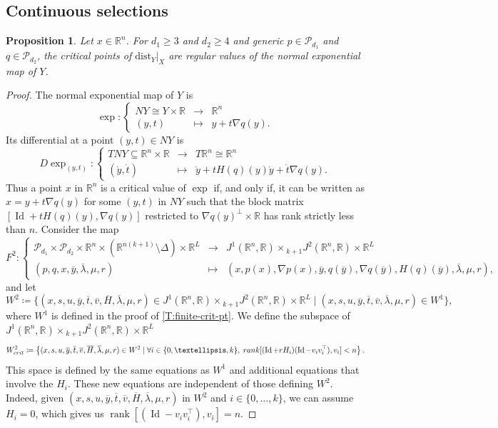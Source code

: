 \documentclass{amsart}
\newcommand{\R}{\mathbb{R}}
\newcommand{\dist}{{\mathrm{dist}_Y|_X}}
\newcommand{\Poly}{\mathscr{P}}
\def\Id{\operatorname{Id}}
\newtheorem{proposition}[subsubsection]{Proposition}
\theoremstyle{definition}
\theoremstyle{remark}
\begin{document}
\subsection{Continuous selections}

\begin{proposition}
\label{P:exp-reg-alg}
Let $x \in \R^n$. For $d_1 \geq 3$ and $d_2 \geq 4$ and generic $p\in \Poly_{d_1}$ and $q\in \Poly_{d_2}$, the critical points of $\dist$ are regular values of the normal exponential map of $Y$.
\end{proposition}

\begin{proof}
The normal exponential map of $Y$ is
\[
\exp \colon \left\{ \begin{array}{ccc}
NY \cong Y \times \R & \to & \R^n \\
(y, t) & \mapsto & y + t \nabla q(y).
\end{array} \right.
\]
Its differential at a point $(y, t) \in NY$ is
\[
D \exp_{(y, t)} \colon \left\{ \begin{array}{ccc}
TNY \subseteq \R^n \times \R & \to & T \R^n \cong \R^n \\
(\dot{y}, \dot{t}) & \mapsto & \dot{y} + t H(q)(y) \dot{y} + \dot{t} \nabla q(y).
\end{array} \right.
\]
Thus a point $x$ in $\R^n$ is a critical value of $\exp$ if, and only if, it can be written as $x = y + t \nabla q(y)$ for some $(y, t)$ in $NY$ such that the block matrix $[\Id + t H(q)(y), \nabla q(y)]$ restricted to $\nabla q(y)^\bot \times \R$ has rank strictly less than $n$. Consider the map
\[
F^2 \colon \left\{ \begin{array}{ccc}
\Poly_{d_1} \times \Poly_{d_2} \times \R^n \times (\R^{n(k + 1)} \setminus \Delta) \times \R^L & \to & J^1(\R^n, \R) \times {}_{k + 1} J^2(\R^n, \R) \times \R^L \\
(p, q, x, \overline{y}, \overline{\lambda}, \mu, r) & \mapsto & (x, p(x), \nabla p(x), \overline{y}, q(\overline{y}), \nabla q(\overline{y}), H(q)(\overline{y}), \overline{\lambda}, \mu, r),
\end{array} \right.
\]
and let
\[
W^2 \coloneqq \{(x, s, u, \overline{y}, \overline{t}, \overline{v}, \overline{H}, \overline{\lambda}, \mu, r) \in J^1(\R^n, \R) \times {}_{k + 1} J^2(\R^n, \R) \times \R^{L} \mid (x, s, u, \overline{y}, \overline{t}, \overline{v}, \overline{\lambda}, \mu, r) \in W^1\},
\]
where $W^1$ is defined in the proof of \cref{T:finite-crit-pt}. We define the subspace of $J^1(\R^n, \R) \times {}_{k + 1} J^2(\R^n, \R) \times \R^L$
\[
W^2_{\textnormal{crit}} \coloneqq \left\{
(x, s, u, \overline{y}, \overline{t}, \overline{v}, \overline{H}, \overline{\lambda}, \mu, r) \in W^2
\mid
\forall i \in \{0, \ldots, k\}, \; \textnormal{rank}[(\Id + r H_i) (\Id - v_i v_i^\top), v_i] < n
\right\}.
\]
This space is defined by the same equations as $W^1$ and additional equations that involve the $H_i$. These new equations are independent of those defining $W^2$. Indeed, given $(x, s, u, \overline{y}, \overline{t}, \overline{v}, \overline{H}, \overline{\lambda}, \mu, r)$ in $W^2$ and $i \in \{0, \ldots, k\}$, we can assume $H_i = 0$, which gives us $\operatorname{rank}[(\Id - v_i v_i^\top), v_i] = n$.


\end{proof}
\end{document}
